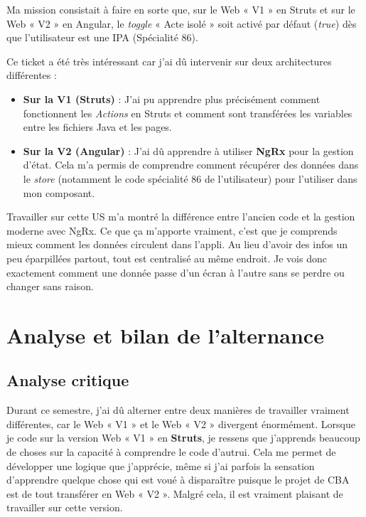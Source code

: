 \documentclass{article}
\begin{document}
Ma mission consistait à faire en sorte que, sur le Web « V1 » en Struts et sur le Web « V2 » en Angular, le \textit{toggle} « Acte isolé » soit activé par défaut (\textit{true}) dès que l'utilisateur est une IPA (Spécialité 86).

Ce ticket a été très intéressant car j'ai dû intervenir sur deux architectures différentes :

\begin{itemize}
    \item \textbf{Sur la V1 (Struts)} : J'ai pu apprendre plus précisément comment fonctionnent les \textit{Actions} en Struts et comment sont transférées les variables entre les fichiers Java et les pages.
    
    \item \textbf{Sur la V2 (Angular)} : J'ai dû apprendre à utiliser \textbf{NgRx} pour la gestion d'état. Cela m'a permis de comprendre comment récupérer des données dans le \textit{store} (notamment le code spécialité 86 de l'utilisateur) pour l'utiliser dans mon composant.
\end{itemize}

Travailler sur cette US m'a montré la différence entre l'ancien code et la gestion moderne avec NgRx. Ce que ça m'apporte vraiment, c'est que je comprends mieux comment les données circulent dans l'appli. Au lieu d'avoir des infos un peu éparpillées partout, tout est centralisé au même endroit. Je vois donc exactement comment une donnée passe d'un écran à l'autre sans se perdre ou changer sans raison.

\section{Analyse et bilan de l'alternance}

\subsection{Analyse critique}

Durant ce semestre, j'ai dû alterner entre deux manières de travailler vraiment différentes, car le Web « V1 » et le Web « V2 » divergent énormément. Lorsque je code sur la version Web « V1 » en \textbf{Struts}, je ressens que j'apprends beaucoup de choses sur la capacité à comprendre le code d'autrui. Cela me permet de développer une logique que j'apprécie, même si j'ai parfois la sensation d'apprendre quelque chose qui est voué à disparaître puisque le projet de CBA est de tout transférer en Web « V2 ». Malgré cela, il est vraiment plaisant de travailler sur cette version.
\end{document}
